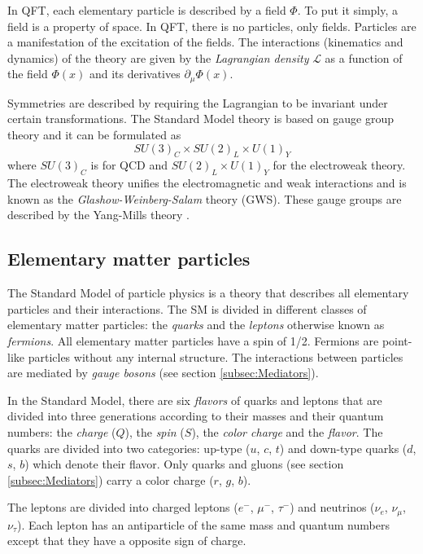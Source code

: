 In QFT, each elementary particle is described by a field $\Phi$. To put it simply, a field is a property of space. In QFT, there is no particles, only fields. Particles are a manifestation of the excitation of the fields. The interactions (kinematics and dynamics) of the theory are given by the \textit{Lagrangian density} $\mathcal{L}$ as a function of the field $\Phi(x)$ and its derivatives $\partial_{\mu}\Phi(x)$.

Symmetries are described by requiring the Lagrangian to be invariant under certain transformations. The Standard Model theory is based on gauge group theory and it can be formulated as
\begin{equation}
  SU(3)_{C} \times SU(2)_{L} \times U(1)_{Y}
\end{equation}
where $SU(3)_{C}$ is for QCD and $SU(2)_{L} \times U(1)_{Y}$ for the electroweak theory. The electroweak theory unifies the electromagnetic and weak interactions and is known as the \textit{Glashow-Weinberg-Salam} theory (GWS). These gauge groups are described by the Yang-Mills theory \cite{Yang:1954ek}.

\subsection{Elementary matter particles}

The Standard Model of particle physics is a theory that describes all elementary particles and their interactions. The SM is divided in different classes of elementary matter particles: the \textit{quarks} and the \textit{leptons} otherwise known as \textit{fermions}. All elementary matter particles have a spin of 1/2. Fermions are point-like particles without any internal structure. The interactions between particles are mediated by \textit{gauge bosons} (see section \ref{subsec:Mediators}).

In the Standard Model, there are six \textit{flavors} of quarks and leptons that are divided into three generations according to their masses and their quantum numbers: the \textit{charge} ($Q$), the \textit{spin} ($S$), the \textit{color charge} and the \textit{flavor}. The quarks are divided into two categories: up-type ($u$, $c$, $t$) and down-type quarks ($d$, $s$, $b$) which denote their flavor. Only quarks and gluons (see section \ref{subsec:Mediators}) carry a color charge ($r$, $g$, $b$).

The leptons are divided into charged leptons ($e^-$, $\mu^-$, $\tau^-$) and neutrinos ($\nu_e$, $\nu_{\mu}$, $\nu_{\tau}$). Each lepton has an antiparticle of the same mass and quantum numbers except that they have a opposite sign of charge.

